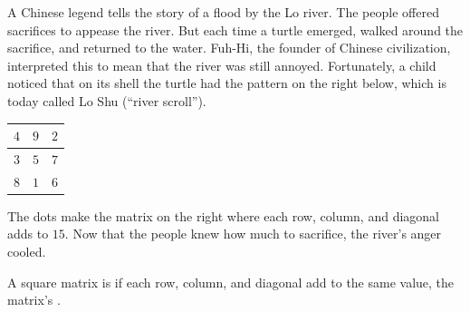 A Chinese legend tells the story of a  
flood by the Lo river.
The people offered sacrifices to appease the river.
But each time a turtle emerged, 
walked around the sacrifice, and returned to the water.
Fuh-Hi, %
the founder of Chinese civilization,
interpreted this to mean that
the river was still annoyed.  
Fortunately, a child noticed 
that on its shell the turtle had the pattern on the right below, which is today
called Lo Shu (``river scroll'').
\begin{center}
  \hspace{1in}
  \begin{tabular}{|c|c|c|}
    \hline
      $4$  &$9$  &$2$  \\ \hline
      $3$  &$5$  &$7$  \\ \hline
      $8$  &$1$  &$6$  \\ \hline    
  \end{tabular}
\end{center}
The dots make the matrix on the right where
each row, column, 
and diagonal adds to $15$.
Now that the people knew how much to sacrifice, 
the river's anger cooled.

A square matrix is 
if each row, column, and diagonal add to the same
value, the matrix's .

